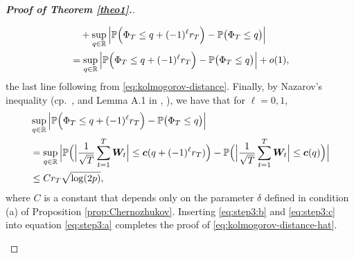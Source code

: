 \documentclass[a4paper,12pt]{article}
\numberwithin{equation}{section}
\begin{document}
\begin{proof}[\textnormal{\textbf{Proof of Theorem \ref{theo1}.}}]
\begin{enumerate}[label=\textit{Step \arabic*.}, leftmargin=0cm, itemindent=1.45cm]
\begin{align}
 & \quad + \sup_{q \in \mathbb{R}} \Big| \mathbb{P} \Big( \Phi_T \le q + (-1)^\ell r_T \Big) - \mathbb{P} \big( \Phi_T \le q \big) \Big| \nonumber \\
 & = \sup_{q \in \mathbb{R}} \Big| \mathbb{P} \Big( \Phi_T \le q + (-1)^\ell r_T \Big) - \mathbb{P} \big( \Phi_T \le q \big) \Big| + o(1), \label{eq:step3:b}
\end{align}
the last line following from \eqref{eq:kolmogorov-distance}. Finally, by Nazarov's inequality (cp.\ \citeauthor{Nazarov2003}, \citeyear{Nazarov2003} and Lemma A.1 in \citeauthor{Chernozhukov2017}, \citeyear{Chernozhukov2017}), we have that for $\ell = 0,1$,   
\begin{align} 
 & \sup_{q \in \mathbb{R}} \Big| \mathbb{P} \Big( \Phi_T \le q + (-1)^\ell r_T \Big) - \mathbb{P} \big( \Phi_T \le q \big) \Big| \nonumber \\
 & = \sup_{q \in \mathbb{R}} \Big| \mathbb{P} \Big( \Big|\frac{1}{\sqrt{T}} \sum_{t=1}^T \boldsymbol{W}_t\Big| \le \boldsymbol{c}(q + (-1)^\ell r_T) \Big) - \mathbb{P} \Big( \Big|\frac{1}{\sqrt{T}} \sum_{t=1}^T \boldsymbol{W}_t\Big| \le \boldsymbol{c}(q) \Big) \Big| \nonumber \\
 & \le C r_T \sqrt{\log(2 p)}, \label{eq:step3:c}
\end{align}
where $C$ is a constant that depends only on the parameter $\delta$ defined in condition (a) of Proposition \ref{prop:Chernozhukov}. Inserting \eqref{eq:step3:b} and \eqref{eq:step3:c} into equation \eqref{eq:step3:a} completes the proof of \eqref{eq:kolmogorov-distance-hat}.



\end{enumerate}
\end{proof}
\end{document}
